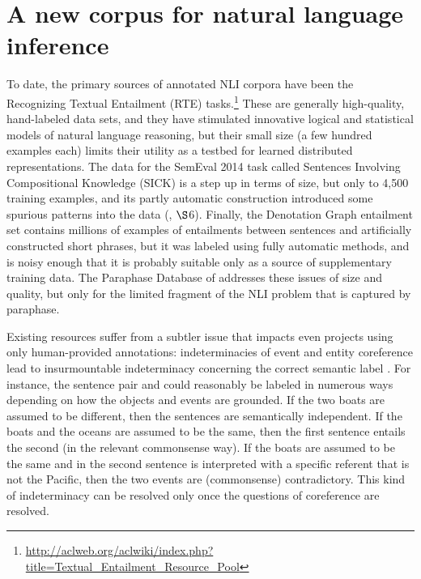 \section{A new corpus for natural language inference}\label{sec:discussion}

To date, the primary sources of annotated NLI corpora have been the
Recognizing Textual Entailment (RTE)
tasks.\footnote{\url{http://aclweb.org/aclwiki/index.php?title=Textual_Entailment_Resource_Pool}}
These are generally high-quality, hand-labeled data sets, and they
have stimulated innovative logical and statistical models of natural
language reasoning, but their small size (a few hundred examples each)
limits their utility as a testbed for learned distributed representations. 
The data for the SemEval 2014 task called Sentences Involving Compositional Knowledge (SICK) is a
step up in terms of size, but only to 4,500 training examples, and its
partly automatic construction introduced some spurious patterns into
the data (\citealt{marelli2014semeval}, $\S$6). Finally, the
Denotation Graph entailment set \cite{hodoshimage} contains millions of
examples of entailments between sentences and artificially constructed
short phrases, but it was labeled using fully automatic methods, and is
noisy enough that it is probably suitable only as a source of
supplementary training data. The Paraphase Database of \cite{ganitkevitch2013ppdb}
addresses these issues of size and quality, but only for the limited
fragment of the NLI problem that is captured by paraphase.

Existing resources suffer from a subtler issue that impacts even
projects using only human-provided annotations: indeterminacies of
event and entity coreference lead to insurmountable indeterminacy
concerning the correct semantic label \cite{marelli2014sick}. For
instance, the sentence pair  and  could reasonably be labeled in
numerous ways depending on how the objects and events are grounded. If
the two boats are assumed to be different, then the sentences are semantically
independent. If the boats and the oceans are assumed to be the same,
then the first sentence entails the second (in the relevant
commonsense way). If the boats are assumed to be the same and 
 in the second sentence is interpreted with a specific referent 
that is not the Pacific, then the two events are (commonsense) contradictory. This
kind of indeterminacy can be resolved only once the questions of
coreference are resolved.

